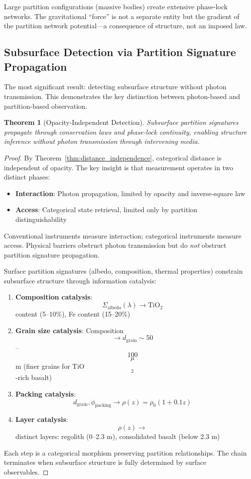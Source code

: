 \documentclass[11pt,twocolumn,a4paper]{article}
\newtheorem{theorem}{Theorem}[section]
\theoremstyle{definition}
\theoremstyle{remark}
\begin{document}
Large partition configurations (massive bodies) create extensive phase-lock networks. The gravitational ``force'' is not a separate entity but the gradient of the partition network potential---a consequence of structure, not an imposed law.

\subsection{Subsurface Detection via Partition Signature Propagation}

The most significant result: detecting subsurface structure without photon transmission. This demonstrates the key distinction between photon-based and partition-based observation.

\begin{theorem}[Opacity-Independent Detection]
\label{thm:subsurface}
Subsurface partition signatures propagate through conservation laws and phase-lock continuity, enabling structure inference without photon transmission through intervening media.
\end{theorem}

\begin{proof}
By Theorem~\ref{thm:distance_independence}, categorical distance is independent of opacity. The key insight is that measurement operates in two distinct phases:
\begin{itemize}
    \item \textbf{Interaction}: Photon propagation, limited by opacity and inverse-square law
    \item \textbf{Access}: Categorical state retrieval, limited only by partition distinguishability
\end{itemize}

Conventional instruments measure interaction; categorical instruments measure access. Physical barriers obstruct photon transmission but do \emph{not} obstruct partition signature propagation.

Surface partition signatures (albedo, composition, thermal properties) constrain subsurface structure through information catalysis:
\begin{enumerate}
    \item \textbf{Composition catalysis}: $$\Sigma_{\text{albedo}}(\lambda) \to \text{TiO}_2$$ content (5--10\%), Fe content (15--20\%)
    \item \textbf{Grain size catalysis}: Composition $$\to d_{\text{grain}} \sim 50$$--$$100$$ $$\mu$$m (finer grains for TiO$$_2$$-rich basalt)
    \item \textbf{Packing catalysis}: $$d_{\text{grain}}, \phi_{\text{packing}} \to \rho(z) = \rho_0(1 + 0.1z)$$
    \item \textbf{Layer catalysis}: $$\rho(z) \to$$ distinct layers: regolith (0--2.3 m), consolidated basalt (below 2.3 m)
\end{enumerate}
Each step is a categorical morphism preserving partition relationships. The chain terminates when subsurface structure is fully determined by surface observables.
\end{proof}
\end{document}
